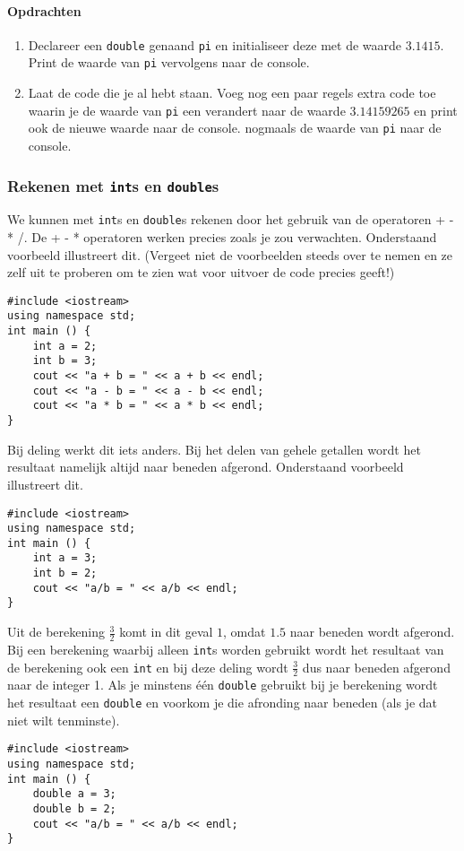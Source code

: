 \documentclass[12pt,a4paper]{article}
\newcommand{\icode}{\lstinline}
\begin{document}
\paragraph{Opdrachten}
\begin{enumerate} 
\item 
	Declareer een \icode{double} genaand \icode{pi} en initialiseer deze met de waarde $3.1415$. 
Print de waarde van \icode{pi} vervolgens naar de console. 
\item 
	Laat de code die je al hebt staan. Voeg nog een paar regels extra code toe waarin je de waarde van \icode{pi} een verandert naar de waarde $3.14159265$ en print ook de nieuwe waarde naar de console. 
nogmaals de waarde van \icode{pi} naar de console. 
\end{enumerate} 

\subsubsection{Rekenen met \icode{int}s en \icode{double}s}

We kunnen met \icode{int}s en \icode{double}s rekenen door het gebruik van de operatoren + - * /. 
De + - * operatoren werken precies zoals je zou verwachten. Onderstaand voorbeeld illustreert dit. (Vergeet niet de voorbeelden steeds over te nemen en ze zelf uit te proberen om te zien wat voor uitvoer de code precies geeft!) 
\begin{lstlisting}
#include <iostream> 
using namespace std; 
int main () {
	int a = 2; 
	int b = 3; 
	cout << "a + b = " << a + b << endl; 
	cout << "a - b = " << a - b << endl; 
	cout << "a * b = " << a * b << endl; 
}
\end{lstlisting}
Bij deling werkt dit iets anders. Bij het delen van gehele getallen wordt het resultaat namelijk altijd naar beneden afgerond. 
Onderstaand voorbeeld illustreert dit.
\begin{lstlisting}
#include <iostream> 
using namespace std; 
int main () {
	int a = 3; 
	int b = 2; 
	cout << "a/b = " << a/b << endl; 
}
\end{lstlisting}
Uit de berekening $\frac 32$ komt in dit geval $1$, omdat $1.5$ naar beneden wordt afgerond. Bij een 
berekening waarbij alleen \icode{int}s worden gebruikt wordt het resultaat van de berekening ook 
een \icode{int} en bij deze deling wordt $\frac 32$ dus naar beneden afgerond naar de integer 1. Als je minstens 
één \icode{double} gebruikt bij je berekening wordt het resultaat een \icode{double} en voorkom je 
die afronding naar beneden (als je dat niet wilt tenminste). 
\begin{lstlisting}
#include <iostream> 
using namespace std; 
int main () {
	double a = 3; 
	double b = 2; 
	cout << "a/b = " << a/b << endl; 
}
\end{lstlisting}
\end{document}
